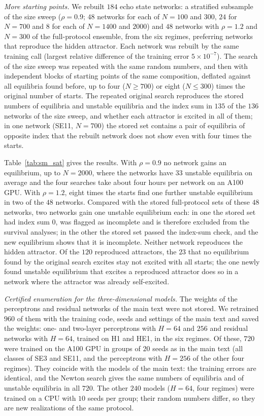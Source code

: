 \documentclass[aip,cha,preprint,amsmath,amssymb,longbibliography]{revtex4-2}
\begin{document}
\emph{More starting points.} We rebuilt $184$ echo state networks: a stratified subsample of the size sweep ($\rho=0.9$;
$48$ networks for each of $N=100$ and $300$, $24$ for $N=700$ and $8$ for each of $N=1400$ and $2000$) and $48$ networks
with $\rho=1.2$ and $N=300$ of the full-protocol ensemble, from the six regimes, preferring networks that reproduce the
hidden attractor. Each network was rebuilt by the same training call (largest relative difference of the training error
$5\times10^{-7}$). The search of the size sweep was repeated with the same random numbers, and then with independent
blocks of starting points of the same composition, deflated against all equilibria found before, up to four ($N\ge700$) or
eight ($N\le300$) times the original number of starts. The repeated original search reproduces the stored numbers of
equilibria and unstable equilibria and the index sum in $135$ of the $136$ networks of the size sweep, and whether each
attractor is excited in all of them; in one network (SE11, $N=700$) the stored set contains a pair of equilibria of
opposite index that the rebuilt network does not show even with four times the starts.

Table~\ref{tab:sm_sat} gives the results. With $\rho=0.9$ no network gains an equilibrium, up to $N=2000$, where the
networks have $33$ unstable equilibria on average and the four searches take about four hours per network on an A100 GPU.
With $\rho=1.2$, eight times the starts find one further unstable equilibrium in two of the $48$ networks. Compared with the
stored full-protocol sets of these $48$ networks, two networks gain one unstable equilibrium each: in one the stored set
had index sum $0$, was flagged as incomplete and is therefore excluded from the survival analyses; in the other the stored
set passed the index-sum check, and the new equilibrium shows that it is incomplete. Neither network reproduces the hidden
attractor. Of the $120$ reproduced attractors, the $23$ that no equilibrium found by the original search excites stay
not excited with all starts; the one newly found unstable equilibrium that excites a reproduced attractor does so in a
network where the attractor was already self-excited.



\emph{Certified enumeration for the three-dimensional models.} The weights of the perceptrons and residual networks of the
main text were not stored. We retrained $960$ of them with the training code, seeds and settings of the main text and saved
the weights: one- and two-layer perceptrons with $H=64$ and $256$ and residual networks with $H=64$, trained on H1 and HE1,
in the six regimes. Of these, $720$ were trained on the A100 GPU in groups of $20$ seeds as in the main text (all classes of
SE3 and SE11, and the perceptrons with $H=256$ of the other four regimes). They coincide with the models of the main text:
the training errors are identical, and the Newton search gives the same numbers of equilibria and of unstable equilibria in
all $720$. The other $240$ models ($H=64$, four regimes) were trained on a CPU with $10$ seeds per group; their random numbers
differ, so they are new realizations of the same protocol.
\end{document}

